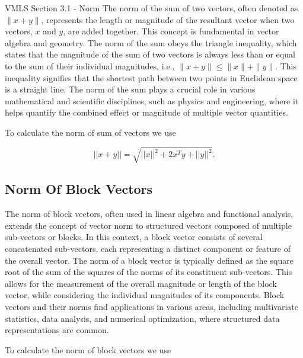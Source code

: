 \begin{notes}{VMLS Section 3.1 - Norm}
    The norm of the sum of two vectors, often denoted as $\|x + y\|$, represents the length or magnitude of the resultant vector when two vectors, $x$ and $y$, are added together. This concept is fundamental in vector 
    algebra and geometry. The norm of the sum obeys the triangle inequality, which states that the magnitude of the sum of two vectors is always less than or equal to the sum of their individual magnitudes, i.e., 
    $\|x + y\| \leq \|x\| + \|y\|$. This inequality signifies that the shortest path between two points in Euclidean space is a straight line. The norm of the sum plays a crucial role in various mathematical and 
    scientific disciplines, such as physics and engineering, where it helps quantify the combined effect or magnitude of multiple vector quantities.

    \begin{Highlight}
        To calculate the norm of sum of vectors we use

        \begin{equation*}
            ||x + y|| = \sqrt{||x||^{2} + 2x^{T}y + ||y||^{2}}.
        \end{equation*}
    \end{Highlight}

    \subsection*{Norm Of Block Vectors}

    The norm of block vectors, often used in linear algebra and functional analysis, extends the concept of vector norm to structured vectors composed of multiple sub-vectors or blocks. In this context, a block 
    vector consists of several concatenated sub-vectors, each representing a distinct component or feature of the overall vector. The norm of a block vector is typically defined as the square root of the sum of 
    the squares of the norms of its constituent sub-vectors. This allows for the measurement of the overall magnitude or length of the block vector, while considering the individual magnitudes of its components. 
    Block vectors and their norms find applications in various areas, including multivariate statistics, data analysis, and numerical optimization, where structured data representations are common.

    \begin{Highlight}
        To calculate the norm of block vectors we use


\end{Highlight}
\end{notes}
